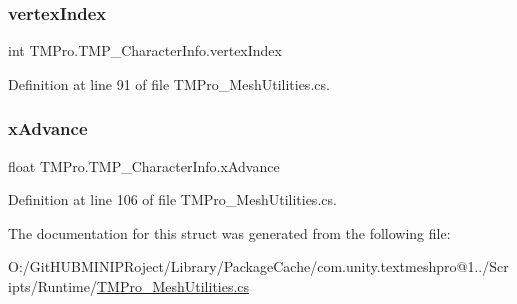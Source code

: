 \subsubsection{\texorpdfstring{vertexIndex}{vertexIndex}}
{\footnotesize\ttfamily int T\+M\+Pro.\+T\+M\+P\+\_\+\+Character\+Info.\+vertex\+Index}



Definition at line 91 of file T\+M\+Pro\+\_\+\+Mesh\+Utilities.\+cs.

\mbox{\label{struct_t_m_pro_1_1_t_m_p___character_info_a4ba39cef6ade72a09842f713363c1bea}} 
\subsubsection{\texorpdfstring{xAdvance}{xAdvance}}
{\footnotesize\ttfamily float T\+M\+Pro.\+T\+M\+P\+\_\+\+Character\+Info.\+x\+Advance}



Definition at line 106 of file T\+M\+Pro\+\_\+\+Mesh\+Utilities.\+cs.



The documentation for this struct was generated from the following file\+:\begin{DoxyCompactItemize}
\item 
O\+:/\+Git\+H\+U\+B\+M\+I\+N\+I\+P\+Roject/\+Library/\+Package\+Cache/com.\+unity.\+textmeshpro@1../\+Scripts/\+Runtime/\mbox{\hyperlink{_t_m_pro___mesh_utilities_8cs}{T\+M\+Pro\+\_\+\+Mesh\+Utilities.\+cs}}\end{DoxyCompactItemize}

